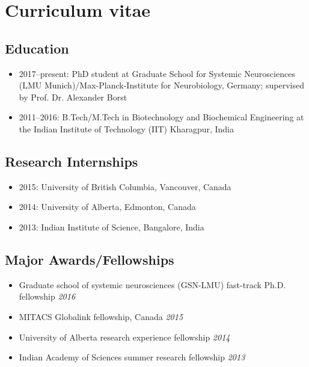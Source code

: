 \chapter*{Curriculum vitae}

\section*{Education}

\begin{itemize}
    \item 2017--present: PhD student at Graduate School for Systemic Neurosciences (LMU Munich)/Max-Planck-Institute for Neurobiology, Germany; supervised by Prof. Dr. Alexander Borst
 
    \item 2011--2016: B.Tech/M.Tech in Biotechnology and Biochemical Engineering at the Indian Institute of Technology (IIT) Kharagpur, India
\end{itemize}

\section*{Research Internships}

\begin{itemize}
     \item 2015: University of British Columbia, Vancouver, Canada
     \item 2014: University of Alberta, Edmonton, Canada
     \item 2013: Indian Institute of Science, Bangalore, India

\end{itemize}

\section*{Major Awards/Fellowships}
\begin{itemize}
\item Graduate school of systemic neurosciences (GSN-LMU) fast-track Ph.D. fellowship \hfill{\em 2016}
\item MITACS Globalink fellowship, Canada \hfill{\em 2015}
\item University of Alberta research experience fellowship \hfill{\em 2014}
\item Indian Academy of Sciences summer research fellowship \hfill{\em 2013}
\end{itemize}

